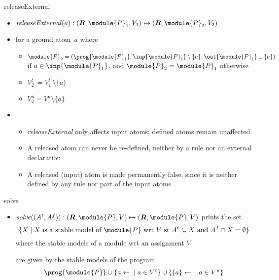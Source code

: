 \begin{frame}{releaseExternal}
  \begin{itemize}
  \item $\mathit{releaseExternal}(a): ( \boldsymbol{R},\module{P}_1,V_1 )\mapsto(\boldsymbol{R},\module{P}_2 ,V_2 )$
    \smallskip
  \item []
    for a ground atom~$a$
    \pause[2]%
    \smallskip
    where
    \smallskip
    \begin{itemize}\normalsize
    \item $\module{P}_2=(\prog{\module{P}_1},\inp{\module{P}_1}\setminus\{a\},\out{\module{P}_1}\cup\{a\})$ if $a\in\inp{\module{P}_1}$,
      and $\module{P}_2=\module{P}_1$ otherwise
    \item $V_2^t\,=V_1^t\,\setminus\{a\}$
    \item [] $V_2^u  =V_1^u  \setminus\{a\}$
    \end{itemize}
  \item<3-> 
    \begin{itemize}
    \item<3-> \textit{releaseExternal} only affects input atoms; defined atoms remain unaffected
    \item<4-> A released atom can never be re-defined, neither by a rule nor an external declaration
    \item<5-> A released (input) atom is made permanently false, since it is neither defined by any rule nor part of the input atoms
    \end{itemize}
  \end{itemize}
\end{frame}
\begin{frame}{solve}
  \begin{itemize}
  \item $\mathit{solve}(( A^t,A^f )): ( \boldsymbol{R},\module{P},V )\mapsto( \boldsymbol{R},\module{P},V )$
    prints the set
    \[
    \{X\mid X\text{ is a stable model of }\module{P}\text{ wrt }V\text{ st }A^t\subseteq X\text{ and }A^f\cap X = \emptyset\}
    \]
    \pause[2]%
    where the stable models of a module  wrt an assignment $V$
    \par
    are given by the stable models of the program
    \[
    \prog{\module{P}}\cup\{{a\leftarrow{}}\mid a\in V^t\}\cup\{{\{a\}\leftarrow{}}\mid a\in V^u\}
    \]
  \end{itemize}
\end{frame}
